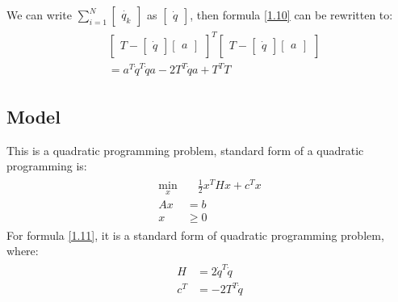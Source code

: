 \documentclass[titlepage,a4paper]{article}
\begin{document}
        We can write $\sum_{i=1}^N \begin{bmatrix} \dot{q_k} \end{bmatrix} $ as $\begin{bmatrix} \dot{q} \end{bmatrix} $, then formula \eqref{1.10} can be rewritten to:
        \begin{align}
        \begin{split}\label{1.11}
            &\begin{bmatrix}T - \begin{bmatrix} \dot{q} \end{bmatrix} \begin{bmatrix} a \end{bmatrix} \end{bmatrix}^T 
            \begin{bmatrix}T - \begin{bmatrix} \dot{q} \end{bmatrix} \begin{bmatrix} a \end{bmatrix} \end{bmatrix}\\
            &= a^T \dot{q}^T \dot{q} a - 2T^T\dot{q}a + T^TT
        \end{split}
        \end{align}
        
    \subsection{Model}
        This is a quadratic programming problem, standard form of a quadratic programming is:
        \begin{align}
        \begin{split}
            \min_x &\quad \frac 12x^THx + c^Tx\\
            Ax &= b\\
            x &\geq 0
        \end{split}
        \end{align} 
        For formula \eqref{1.11}, it is a standard form of quadratic programming problem, where:
        \begin{align}
        \begin{split}\label{1.11}
            H &= 2 \dot{q}^T \dot{q}\\
            c^T &= -2T^T\dot{q}
        \end{split}
        \end{align} 
        
\end{document}
